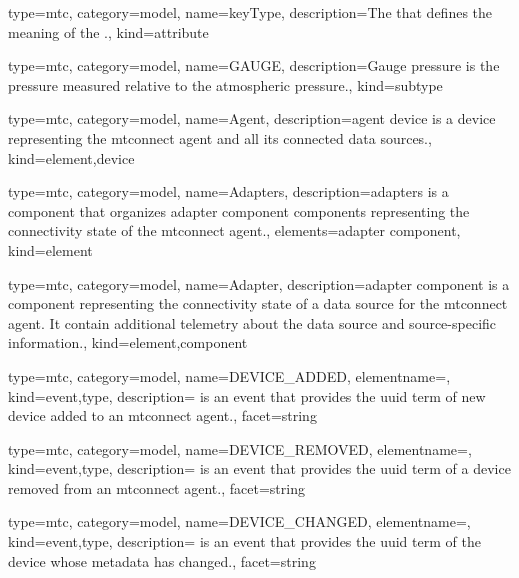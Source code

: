 {
  type=mtc,
  category=model,
  name={keyType},
  description={The   that defines the meaning of the .},
  kind={attribute}
}

{
  type=mtc,
  category=model,
  name={GAUGE},
  description={Gauge pressure is the pressure measured relative to the atmospheric pressure.},
  kind={subtype}
}

{
  type=mtc,
  category=model,
  name={Agent},
  description={\gls{agent device} is a \gls{device} representing the \gls{mtconnect agent} and all its connected data sources.},
  kind={element,device}
}


{
  type=mtc,
  category=model,
  name={Adapters},
  description={\gls{adapters} is a \gls{component} that \glspl{organize} \gls{adapter component} \gls{component}s representing the connectivity state of the \gls{mtconnect agent}.},
  elements={\gls{adapter component}},
  kind={element}
}

{
  type=mtc,
  category=model,
  name={Adapter},
  description={\gls{adapter component} is a \gls{component} representing the connectivity state of a data source for the \gls{mtconnect agent}. It \MAY contain additional telemetry about the data source and source-specific information.},
  kind={element,component}
}

{
  type=mtc,
  category=model,
  name={DEVICE\_ADDED},
  elementname=,
  kind={event,type},
  description={ is an \gls{event} that provides the \gls{uuid term} of new device added to an \gls{mtconnect agent}.},
  facet={\gls{string}}
}

{
  type=mtc,
  category=model,
  name={DEVICE\_REMOVED},
  elementname=,
  kind={event,type},
  description={ is an \gls{event} that provides the \gls{uuid term} of a device removed from an \gls{mtconnect agent}.},
  facet={\gls{string}}
}


{
  type=mtc,
  category=model,
  name={DEVICE\_CHANGED},
  elementname=,
  kind={event,type},
  description={ is an \gls{event} that provides the \gls{uuid term} of the device whose \gls{metadata} has changed.},
  facet={\gls{string}}
}


